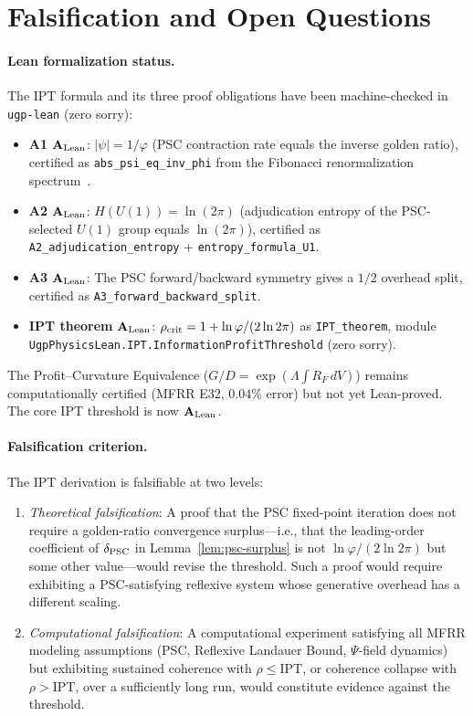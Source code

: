 \documentclass[11pt,twocolumn]{article}
\newcommand{\CatAL}{\ensuremath{\textbf{A}_{\rm Lean}}}
\theoremstyle{remark}
\begin{document}
\section{Falsification and Open Questions}
\label{sec:falsification}

\paragraph{Lean formalization status.}
The IPT formula and its three proof obligations have been machine-checked in \texttt{ugp-lean} (zero sorry):
\begin{itemize}[leftmargin=1.5em,itemsep=0.1em]
  \item \textbf{A1} $\CatAL$: $|\psi| = 1/\varphi$ (PSC contraction rate equals the inverse golden ratio), certified as \texttt{abs\_psi\_eq\_inv\_phi} from the Fibonacci renormalization spectrum~\cite{ugp-lean}.
  \item \textbf{A2} $\CatAL$: $H(U(1)) = \ln(2\pi)$ (adjudication entropy of the PSC-selected $U(1)$ group equals $\ln(2\pi)$), certified as \texttt{A2\_adjudication\_entropy} + \texttt{entropy\_formula\_U1}.
  \item \textbf{A3} $\CatAL$: The PSC forward/backward symmetry gives a $1/2$ overhead split, certified as \texttt{A3\_forward\_backward\_split}.
  \item \textbf{IPT theorem} $\CatAL$: $\rho_{\rm crit} = 1 + \ln\varphi/(2\ln 2\pi)$ as \texttt{IPT\_theorem}, module \texttt{UgpPhysicsLean.\allowbreak{}IPT.\allowbreak{}InformationProfitThreshold} (zero sorry).
\end{itemize}
The Profit--Curvature Equivalence ($G/D = \exp(\Lambda\int R_F\,dV)$) remains computationally certified (MFRR E32, $0.04\%$ error) but not yet Lean-proved. The core IPT threshold is now $\CatAL$.

\paragraph{Falsification criterion.}
The IPT derivation is falsifiable at two levels:

\begin{enumerate}[label=(F\arabic*)]
\item \textit{Theoretical falsification}: A proof that the PSC
  fixed-point iteration does not require a golden-ratio convergence
  surplus---i.e., that the leading-order coefficient of $\delta_{\rm
  PSC}$ in Lemma~\ref{lem:psc-surplus} is not $\ln\varphi/(2\ln
  2\pi)$ but some other value---would revise the threshold. Such a
  proof would require exhibiting a PSC-satisfying reflexive system
  whose generative overhead has a different scaling.

\item \textit{Computational falsification}: A computational experiment
  satisfying all MFRR modeling assumptions (PSC, Reflexive Landauer
  Bound, $\Psi$-field dynamics) but exhibiting sustained coherence with
  $\rho \leq \mathrm{IPT}$, or coherence collapse with $\rho >
  \mathrm{IPT}$, over a sufficiently long run, would constitute
  evidence against the threshold.
\end{enumerate}
\end{document}
